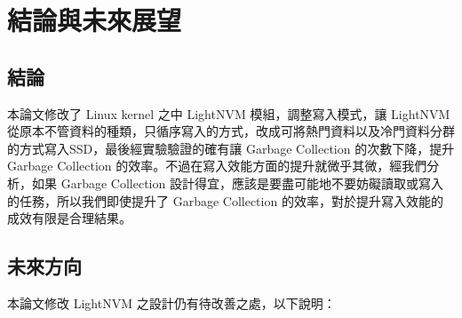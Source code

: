 \chapter{結論與未來展望}
\section{結論}
\indent
本論文修改了 Linux kernel 之中 LightNVM 模組，調整寫入模式，讓 LightNVM 從原本不管資料的種類，只循序寫入的方式，改成可將熱門資料以及冷門資料分群的方式寫入SSD，最後經實驗驗證的確有讓 Garbage Collection 的次數下降，提升 Garbage Collection 的效率。不過在寫入效能方面的提升就微乎其微，經我們分析，如果 Garbage Collection 設計得宜，應該是要盡可能地不要妨礙讀取或寫入的任務，所以我們即使提升了 Garbage Collection 的效率，對於提升寫入效能的成效有限是合理結果。



\section{未來方向}
\indent
本論文修改 LightNVM 之設計仍有待改善之處，以下說明：

